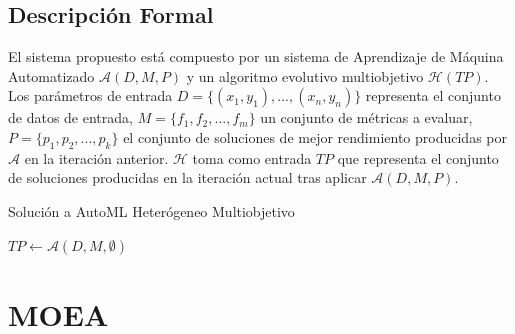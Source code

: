 \subsection{Descripci\'on Formal}
El sistema propuesto est\'a compuesto por un sistema de Aprendizaje de M\'aquina Automatizado $\mathcal{A}(D, M, P)$  y un algoritmo evolutivo multiobjetivo $\mathcal{H}(TP)$. Los par\'ametros de entrada $D = \{(x_1, y_1), ..., (x_n, y_n)\}$ representa el conjunto de datos de entrada, $M = \{f_1, f_2, ..., f_m\}$ un conjunto de m\'etricas a evaluar, $P = \{p_1, p_2, ..., p_k\}$ el conjunto de soluciones de mejor rendimiento producidas por  $\mathcal{A}$ en la iteraci\'on anterior. $\mathcal{H}$ toma como entrada $TP$ que representa el conjunto de soluciones producidas en la iteraci\'on actual tras aplicar $\mathcal{A}(D, M, P)$. 
\begin{algorithm}[ht]\caption{Soluci\'on a AutoML Heter\'ogeneo Multiobjetivo}
    $TP \gets \mathcal{A}(D, M, \emptyset)$ 
\end{algorithm}


\section{MOEA}

